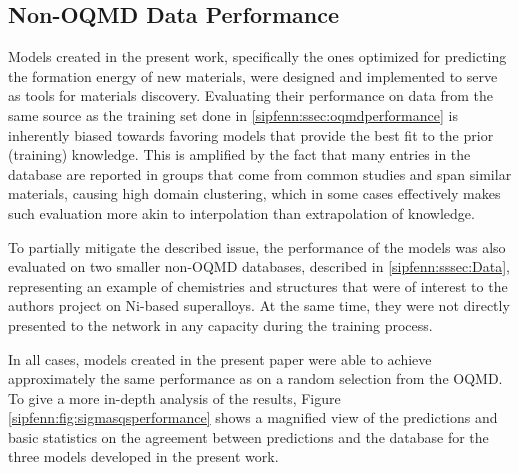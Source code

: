 \subsection{Non-OQMD Data Performance} \label{sipfenn:ssec:sigmasqsperformance}


Models created in the present work, specifically the ones optimized for predicting the formation energy of new materials, were designed and implemented to serve as tools for materials discovery. Evaluating their performance on data from the same source as the training set done in \ref{sipfenn:ssec:oqmdperformance} is inherently biased towards favoring models that provide the best fit to the prior (training) knowledge. This is amplified by the fact that many entries in the database are reported in groups that come from common studies and span similar materials, causing high domain clustering, which in some cases effectively makes such evaluation more akin to interpolation than extrapolation of knowledge.

To partially mitigate the described issue, the performance of the models was also evaluated on two smaller non-OQMD databases, described in \ref{sipfenn:sssec:Data}, representing an example of chemistries and structures that were of interest to the authors project on Ni-based superalloys. At the same time, they were not directly presented to the network in any capacity during the training process.

In all cases, models created in the present paper were able to achieve approximately the same performance as on a random selection from the OQMD. To give a more in-depth analysis of the results, Figure \ref{sipfenn:fig:sigmasqsperformance} shows a magnified view of the predictions and basic statistics on the agreement between predictions and the database for the three models developed in the present work.

